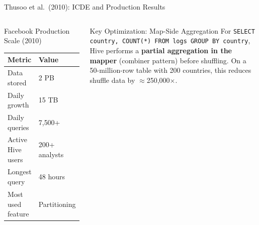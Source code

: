 \documentclass[aspectratio=169,10pt]{beamer}
\begin{document}
\begin{frame}{Thusoo et al.\ (2010): ICDE and Production Results}
\begin{columns}[T]
      \begin{alertblock}{Facebook Production Scale (2010)}
        \renewcommand{\arraystretch}{1.25}
        \begin{tabular}{@{}ll@{}}
          \toprule
          \textbf{Metric} & \textbf{Value} \\
          \midrule
          Data stored        & 2 PB \\
          Daily growth       & 15 TB \\
          Daily queries      & 7{,}500+ \\
          Active Hive users  & 200+ analysts \\
          Longest query      & 48 hours \\
          Most used feature  & Partitioning \\
          \bottomrule
        \end{tabular}
      \end{alertblock}
      \vspace{5pt}
      \begin{exampleblock}{Key Optimization: Map-Side Aggregation}
        For \texttt{SELECT country, COUNT(*) FROM logs GROUP BY country},
        Hive performs a \textbf{partial aggregation in the mapper}
        (combiner pattern) before shuffling.
        On a 50-million-row table with 200 countries, this reduces
        shuffle data by $\approx$250{,}000$\times$.
      \end{exampleblock}
  \end{columns}
\end{frame}
\end{document}
